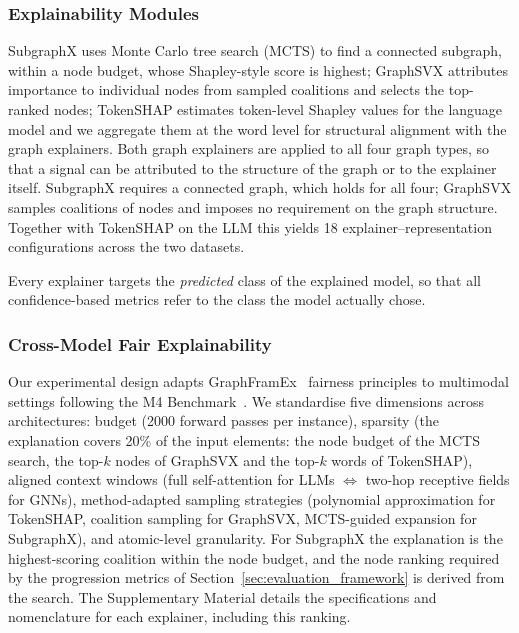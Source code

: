 \documentclass[preprint, times, review, 10pt]{elsarticle}
\begin{document}
\subsubsection{Explainability Modules}

SubgraphX uses Monte Carlo tree search (MCTS) to find a connected subgraph, within a node budget, whose Shapley-style score is highest; GraphSVX attributes importance to individual nodes from sampled coalitions and selects the top-ranked nodes; TokenSHAP estimates token-level Shapley values for the language model and we aggregate them at the word level for structural alignment with the graph explainers. Both graph explainers are applied to all four graph types, so that a signal can be attributed to the structure of the graph or to the explainer itself. SubgraphX requires a connected graph, which holds for all four; GraphSVX samples coalitions of nodes and imposes no requirement on the graph structure. Together with TokenSHAP on the LLM this yields 18 explainer--representation configurations across the two datasets.

Every explainer targets the \emph{predicted} class of the explained model, so that all confidence-based metrics refer to the class the model actually chose.

\subsubsection{Cross-Model Fair Explainability} \label{sec:crossfair}

Our experimental design adapts GraphFramEx~\cite{amara2022graphframex} fairness principles to multimodal settings following the M4 Benchmark~\cite{10.5555/3666122.3666203}. We standardise five dimensions across architectures: budget (2000 forward passes per instance), sparsity (the explanation covers 20\% of the input elements: the node budget of the MCTS search, the top-\(k\) nodes of GraphSVX and the top-\(k\) words of TokenSHAP), aligned context windows (full self-attention for LLMs \(\Leftrightarrow\) two-hop receptive fields for GNNs), method-adapted sampling strategies (polynomial approximation for TokenSHAP, coalition sampling for GraphSVX, MCTS-guided expansion for SubgraphX), and atomic-level granularity. For SubgraphX the explanation is the highest-scoring coalition within the node budget, and the node ranking required by the progression metrics of Section~\ref{sec:evaluation_framework} is derived from the search. The Supplementary Material details the specifications and nomenclature for each explainer, including this ranking.
\end{document}
